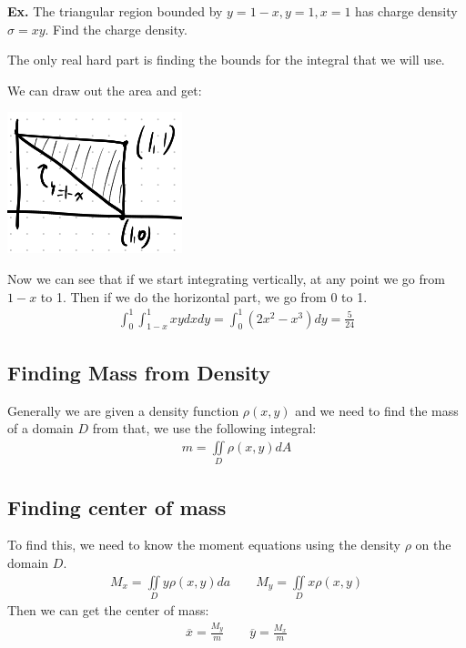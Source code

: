 \documentclass[12pt,letterpaper]{article} \usepackage{amsmath} \usepackage{graphicx} \usepackage[margin=1in]{geometry} \usepackage{longtable}  \usepackage{amssymb}
\begin{document}
	\begin{mdframed}[]
	\textbf{Ex. } The triangular region bounded by $y=1-x, y=1, x=1$ has charge density $\sigma=xy$. Find the charge density.
	
	The only real hard part is finding the bounds for the integral that we will use. 
	
	We can draw out the area and get:
	\begin{center}
		\includegraphics[width=0.2\linewidth]{ex}
	\end{center}
	Now we can see that if we start integrating vertically, at any point we go from $1-x$ to 1. Then if we do the horizontal part, we go from 0 to 1.
	\begin{align*}
		\int^1_0\int^1_{1-x} xy dxdy = \int^1_0 \left(2x^2-x^3\right) dy = \frac{5}{24}
	\end{align*}
	
	\end{mdframed}
	
	\subsection{Finding Mass from Density}
	Generally we are given a density function $\rho (x,y)$ and we need to find the mass of a domain $D$ from that, we use the following integral:
	\begin{align*}
		m = \iint\limits_D \rho(x,y) dA
	\end{align*}
	
	\subsection{Finding center of mass}
	To find this, we need to know the moment equations using the density $\rho$ on the domain $D$.
	\begin{align*}
		M_x = \iint\limits_D y\rho(x,y) da \qquad M_y = \iint\limits_D x\rho(x,y)
	\end{align*}
	Then we can get the center of mass:
	\begin{align*}
		\overline{x} = \frac{M_y}{m} \qquad \overline{y} = \frac{M_x}{m}
	\end{align*}
\end{document}
